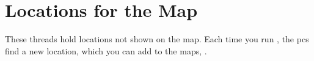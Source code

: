 \section{Locations for the Map}

These \glspl{thread} hold locations not shown on the map.
Each time you run , the \glspl{pc} find a new location, which you can add to the maps, .
